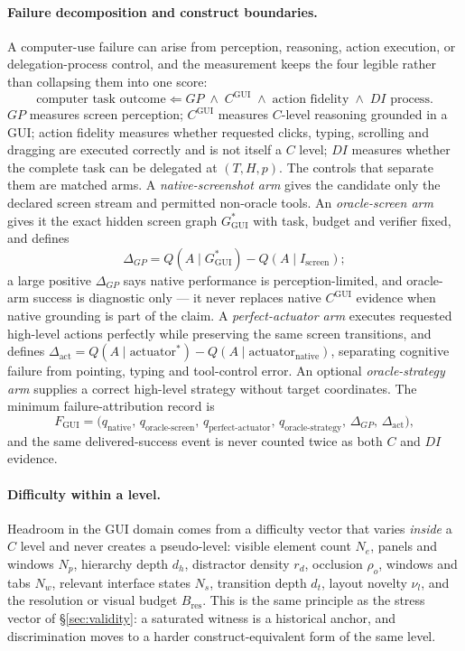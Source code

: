 \documentclass[11pt]{article}
\theoremstyle{definition}
\begin{document}
\paragraph{Failure decomposition and construct boundaries.} A computer-use failure can arise from perception, reasoning, action execution, or delegation-process control, and the measurement keeps the four legible rather than collapsing them into one score:
\[
\text{computer task outcome} \Leftarrow GP \;\wedge\; C^{\mathrm{GUI}} \;\wedge\; \text{action fidelity} \;\wedge\; DI \text{ process}.
\]
$GP$ measures screen perception; $C^{\mathrm{GUI}}$ measures $C$-level reasoning grounded in a GUI; action fidelity measures whether requested clicks, typing, scrolling and dragging are executed correctly and is not itself a $C$ level; $DI$ measures whether the complete task can be delegated at $(T, H, p)$. The controls that separate them are matched arms. A \emph{native-screenshot arm} gives the candidate only the declared screen stream and permitted non-oracle tools. An \emph{oracle-screen arm} gives it the exact hidden screen graph $G^{*}_{\mathrm{GUI}}$ with task, budget and verifier fixed, and defines
\[
\Delta_{GP} = Q(A \mid G^{*}_{\mathrm{GUI}}) - Q(A \mid I_{\mathrm{screen}});
\]
a large positive $\Delta_{GP}$ says native performance is perception-limited, and oracle-arm success is diagnostic only --- it never replaces native $C^{\mathrm{GUI}}$ evidence when native grounding is part of the claim. A \emph{perfect-actuator arm} executes requested high-level actions perfectly while preserving the same screen transitions, and defines $\Delta_{\mathrm{act}} = Q(A \mid \text{actuator}^{*}) - Q(A \mid \text{actuator}_{\mathrm{native}})$, separating cognitive failure from pointing, typing and tool-control error. An optional \emph{oracle-strategy arm} supplies a correct high-level strategy without target coordinates. The minimum failure-attribution record is
\[
F_{\mathrm{GUI}} = \big(q_{\mathrm{native}},\, q_{\mathrm{oracle\text{-}screen}},\, q_{\mathrm{perfect\text{-}actuator}},\, q_{\mathrm{oracle\text{-}strategy}},\, \Delta_{GP},\, \Delta_{\mathrm{act}}\big),
\]
and the same delivered-success event is never counted twice as both $C$ and $DI$ evidence.

\paragraph{Difficulty within a level.} Headroom in the GUI domain comes from a difficulty vector that varies \emph{inside} a $C$ level and never creates a pseudo-level: visible element count $N_e$, panels and windows $N_p$, hierarchy depth $d_h$, distractor density $r_d$, occlusion $\rho_o$, windows and tabs $N_w$, relevant interface states $N_s$, transition depth $d_t$, layout novelty $\nu_l$, and the resolution or visual budget $B_{\mathrm{res}}$. This is the same principle as the stress vector of \S\ref{sec:validity}: a saturated witness is a historical anchor, and discrimination moves to a harder construct-equivalent form of the same level.
\end{document}
